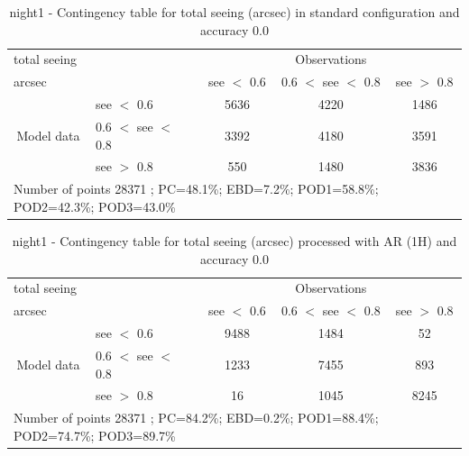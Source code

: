 \clearpage
\begin{table}[p!]
\begin{center}
\begin{tabular}{llccc}
\hline
{total seeing}                                       &                                                    & \multicolumn{3}{c}{Observations}                 \\
{arcsec}                                       &                             & see $<$ 0.6   & 0.6 $<$ see $<$ 0.8 & see $>$ 0.8 \\
\hline
\multicolumn{1}{c}{\multirow{3}{*}{Model data}}  & see $<$ 0.6             & 5636                & 4220                       & 1486              \\
                                                 & 0.6  $<$ see $<$ 0.8 & 3392                & 4180                       & 3591              \\
                                                 & see $>$ 0.8             & 550                & 1480                       & 3836              \\
\hline
\multicolumn{5}{l}{ Number of points        28371 ; PC=48.1\%; EBD=7.2\%; POD1=58.8\%; POD2=42.3\%; POD3=43.0\%}
\end{tabular}
\end{center}
\caption{night1 - Contingency table for  total seeing (arcsec) in standard configuration and accuracy 0.0}
\label{tab:contingencyseeBEF:night1}
\end{table}
\begin{table}[p!]
\begin{center}
\begin{tabular}{llccc}
\hline
{total seeing}                                       &                                                    & \multicolumn{3}{c}{Observations}                 \\
{arcsec}                                       &                             & see $<$ 0.6   & 0.6 $<$ see $<$ 0.8 & see $>$ 0.8 \\
\hline
\multicolumn{1}{c}{\multirow{3}{*}{Model data}}  & see $<$ 0.6             & 9488                & 1484                       & 52              \\
                                                 & 0.6  $<$ see $<$ 0.8 & 1233                & 7455                       & 893              \\
                                                 & see $>$ 0.8             & 16                & 1045                       & 8245              \\
\hline
\multicolumn{5}{l}{ Number of points        28371 ; PC=84.2\%; EBD=0.2\%; POD1=88.4\%; POD2=74.7\%; POD3=89.7\%}
\end{tabular}
\end{center}
\caption{night1 - Contingency table for  total seeing (arcsec) processed with AR (1H) and accuracy 0.0}
\label{tab:contingencyseeAFT:night1}
\end{table}
